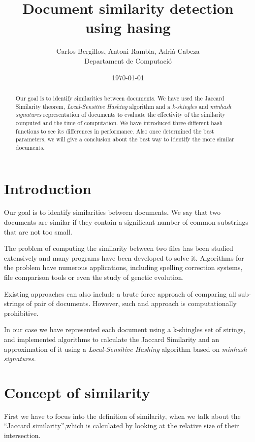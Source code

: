 \documentclass[12pt]{article}
\author{Carlos Bergillos, Antoni Rambla, Adrià Cabeza\\ Departament de Computació}
\title{Document similarity detection using hasing }
\date{\today}
\begin{document}
  \maketitle  

  \vspace{2cm}
	\begin{abstract}

Our goal is to identify similarities between documents. We have used the Jaccard Similarity theorem,  \textit{Local-Sensitive Hashing} algorithm
 and a \textit{k-shingles} and \textit{minhash signatures} representation of documents to evaluate the effectivity of the similarity computed and the time of computation. We have introduced three different hash functions to see its differences in performance.  Also  once determined the best parameters, we will give a conclusion about the best way to identify the more similar documents. 
\end{abstract}

\newpage
\tableofcontents
\newpage

\section{Introduction}

Our goal is to identify similarities between documents. We say that two documents are similar if they contain a significant number of common substrings that are not too small. 

The problem of computing the similarity between two files has been studied extensively and many programs have been developed to solve it. Algorithms for the problem have numerous applications, including spelling correction systems, file comparison tools or even the study of genetic evolution.

 Existing approaches can also include a brute force approach of comparing all sub-strings of pair of documents. However, such and approach is computationally prohibitive. 

 In our case we have represented each document using a k-shingles set of strings, and implemented algorithms to calculate the Jaccard Similarity and an approximation of it using a \textit{Local-Sensitive Hashing} algorithm
 based on \textit{minhash signatures}.


 
\section{Concept of similarity} \label{similarity}
First we have to focus into the definition of similarity, when we talk about the ``Jaccard similarity'',which is calculated by looking at the relative size of their intersection. 
\end{document}
